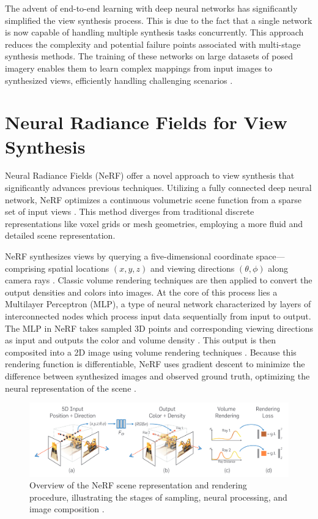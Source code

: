 The advent of end-to-end learning with deep neural networks has significantly simplified the view synthesis process. This is due to the fact that a single network is now capable of handling multiple synthesis tasks concurrently.
This approach reduces the complexity and potential failure points associated with multi-stage synthesis methods.
The training of these networks on large datasets of posed imagery enables them to learn complex mappings from input images to synthesized views, efficiently handling challenging scenarios \cite{chen_photographic_2017,flynn_deep_2016}.

\section{Neural Radiance Fields for View Synthesis}

Neural Radiance Fields (NeRF) offer a novel approach to view synthesis that significantly advances previous techniques.
Utilizing a fully connected deep neural network, NeRF optimizes a continuous volumetric scene function from a sparse set of input views \cite{mildenhall_nerf_2021}.
This method diverges from traditional discrete representations like voxel grids or mesh geometries, employing a more fluid and detailed scene representation.

NeRF synthesizes views by querying a five-dimensional coordinate space—comprising spatial locations \((x, y, z)\) and viewing directions \((\theta, \phi)\) along camera rays .
Classic volume rendering techniques are then applied to convert the output densities and colors into images.
At the core of this process lies a Multilayer Perceptron (MLP), a type of neural network characterized by layers of interconnected nodes which process input data sequentially from input to output.
The MLP in NeRF takes sampled 3D points and corresponding viewing directions as input and outputs the color and volume density .
This output is then composited into a 2D image using volume rendering techniques .
Because this rendering function is differentiable, NeRF uses gradient descent to minimize the difference between synthesized images and observed ground truth, optimizing the neural representation of the scene .

\begin{figure}[h!]
  \centering
  \includegraphics[width=\textwidth]{figures/bg-nerf.png}
  \caption{Overview of the NeRF scene representation and rendering procedure, illustrating the stages of sampling, neural processing, and image composition \cite{mildenhall_nerf_2021}.}
  \label{fig:nerf-overview}
\end{figure}

